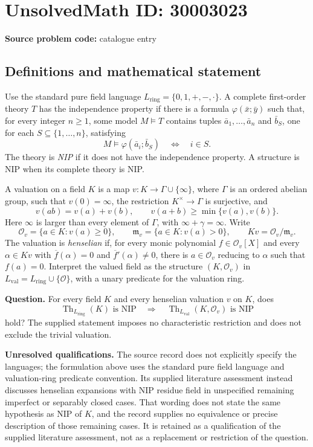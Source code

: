 \documentclass[11pt]{article}
\begin{document}
\section*{UnsolvedMath ID: 30003023}
\textbf{Source problem code:} catalogue entry
\subsection{Definitions and mathematical statement}
Use the standard pure field language \(L_{\mathrm{ring}}=\{0,1,+,-,\cdot\}\). A complete first-order theory \(T\) has the independence property if there is a formula \(\varphi(\bar x;\bar y)\) such that, for every integer \(n\geq 1\), some model \(M\models T\) contains tuples \(\bar a_1,\ldots,\bar a_n\) and \(\bar b_S\), one for each \(S\subseteq\{1,\ldots,n\}\), satisfying
\[
M\models\varphi(\bar a_i;\bar b_S)\quad\Longleftrightarrow\quad i\in S.
\]
The theory is \emph{NIP} if it does not have the independence property. A structure is NIP when its complete theory is NIP.

A valuation on a field \(K\) is a map \(v:K\to\Gamma\cup\{\infty\}\), where \(\Gamma\) is an ordered abelian group, such that \(v(0)=\infty\), the restriction \(K^\times\to\Gamma\) is surjective, and
\[
v(ab)=v(a)+v(b),\qquad v(a+b)\geq\min\{v(a),v(b)\}.
\]
Here \(\infty\) is larger than every element of \(\Gamma\), with \(\infty+\gamma=\infty\). Write
\[
\mathcal O_v=\{a\in K:v(a)\geq0\},\qquad
\mathfrak m_v=\{a\in K:v(a)>0\},\qquad
Kv=\mathcal O_v/\mathfrak m_v.
\]
The valuation is \emph{henselian} if, for every monic polynomial \(f\in\mathcal O_v[X]\) and every \(\alpha\in Kv\) with \(\overline f(\alpha)=0\) and \(\overline f'(\alpha)\neq0\), there is \(a\in\mathcal O_v\) reducing to \(\alpha\) such that \(f(a)=0\). Interpret the valued field as the structure \((K,\mathcal O_v)\) in \(L_{\mathrm{val}}=L_{\mathrm{ring}}\cup\{\mathcal O\}\), with a unary predicate for the valuation ring.

\textbf{Question.} For every field \(K\) and every henselian valuation \(v\) on \(K\), does
\[
\operatorname{Th}_{L_{\mathrm{ring}}}(K)\text{ is NIP}
\quad\Longrightarrow\quad
\operatorname{Th}_{L_{\mathrm{val}}}(K,\mathcal O_v)\text{ is NIP}
\]
hold? The supplied statement imposes no characteristic restriction and does not exclude the trivial valuation.

\textbf{Unresolved qualifications.} The source record does not explicitly specify the languages; the formulation above uses the standard pure field language and valuation-ring predicate convention. Its supplied literature assessment instead discusses henselian expansions with NIP residue field in unspecified remaining imperfect or separably closed cases. That wording does not state the same hypothesis as NIP of \(K\), and the record supplies no equivalence or precise description of those remaining cases. It is retained as a qualification of the supplied literature assessment, not as a replacement or restriction of the question.
\end{document}

